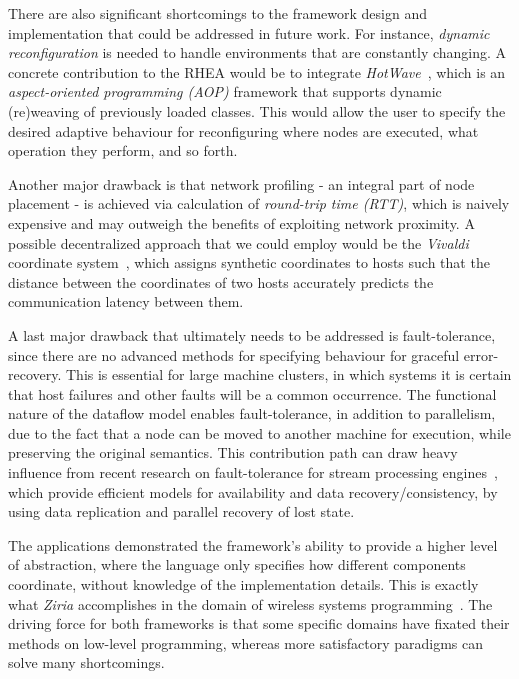 \documentclass[sigplan,screen]{acmart}
\begin{document}
There are also significant shortcomings to the framework design and implementation that
could be addressed in future work.
For instance, \textit{dynamic reconfiguration} is needed to handle environments that are constantly changing.
A concrete contribution to the \textsc{RHEA} would be to integrate \textit{HotWave}~\cite{reconf_java},
which is an \textit{aspect-oriented programming (AOP)} framework that supports dynamic
(re)weaving of previously loaded classes. This would allow the user to specify the desired
adaptive behaviour for reconfiguring where nodes are executed, what operation they perform, and so forth.

Another major drawback is that network profiling - an integral part of node placement - is achieved via
calculation of \textit{round-trip time (RTT)}, which is naively expensive and may outweigh the benefits of
exploiting network proximity. A possible decentralized approach that we could employ would be the \textit{Vivaldi}
coordinate system~\cite{vivaldi}, which assigns synthetic coordinates to hosts
such that the distance between the coordinates of two hosts accurately predicts
the communication latency between them.

A last major drawback that ultimately needs to be addressed is fault-tolerance,
since there are no advanced methods for specifying behaviour for graceful
error-recovery. This is essential for large machine clusters, in which systems it is
certain that host failures and other faults will be a common occurrence. The
functional nature of the dataflow model enables fault-tolerance, in addition to
parallelism, due to the fact that a node can be moved to another machine for
execution, while preserving the original semantics.  This contribution path can draw
heavy influence from recent research on fault-tolerance for stream processing engines~\cite{borealis},
which provide efficient models for availability and data recovery/consistency,
by using data replication and parallel recovery of lost state.

The applications demonstrated the framework's ability to provide a higher level
of abstraction, where the language only specifies how different components
coordinate, without knowledge of the implementation details. This is exactly
what \textit{Ziria} accomplishes in the domain of wireless systems
programming~\cite{ziria}. The driving force for both frameworks is that some
specific domains have fixated their methods on low-level programming, whereas
more satisfactory paradigms can solve many shortcomings.



\end{document}
